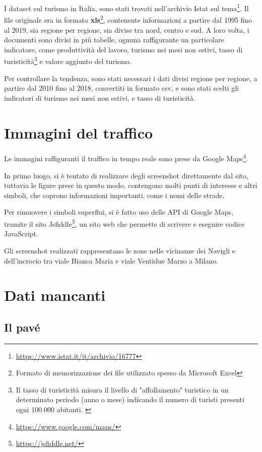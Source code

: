 \documentclass[a4paper,12pt]{report}
\newcommand{\engstyle}[1]{\textbf{#1}}
\begin{document}
I dataset sul turismo in Italia, sono stati trovati nell'archivio Istat sul 
tema\footnote{\url{https://www.istat.it/it/archivio/16777}}. 
Il file originale era in formato \engstyle{xls}\footnote{Formato di memorizzazione dei file 
utilizzato spesso da Microsoft Excel}, 
contenente informazioni a partire dal 1995 
fino al 2019, sia regione per regione, sia divise tra nord, centro e sud. 
A loro volta, i documenti sono divisi in più tabelle, ognuna raffigurante un particolare 
indicatore, come produttività del lavoro, turismo nei mesi non estivi, 
tasso di turisticità\footnote{Il tasso di turisticità misura il livello di "affollamento" 
turistico in un determinato periodo (anno o mese) indicando il numero di turisti presenti 
ogni 100.000 abitanti. \cite{ONTIT:1}} 
e valore aggiunto del turismo. 

Per controllare la tendenza, sono stati necessari i dati divisi regione per regione, 
a partire dal 2010 fino al 2018, convertiti in formato csv, e sono stati scelti gli 
indicatori di turismo nei mesi non estivi, e tasso di turisticità. 

\section{Immagini del traffico}

Le immagini raffiguranti il traffico in tempo reale sono prese da Google 
Maps\footnote{\url{https://www.google.com/maps/}}. 

In primo luogo, si è tentato di realizzare degli screenshot direttamente dal sito, 
tuttavia le figure prese in questo modo, contengono molti punti di interesse e altri simboli, 
che coprono informazioni importanti, come i nomi delle strade. 

Per rimuovere i simboli superflui, si è fatto uso delle API di Google Maps, 
tramite il sito Jsfiddle\footnote{\url{https://jsfiddle.net/}}, un sito web che permette di 
scrivere e eseguire codice JavaScript. 

Gli screenshot realizzati rappresentano le zone nelle vicinanze dei Navigli 
e dell'incrocio tra viale Bianca Maria e viale Ventidue Marzo a Milano. 

\section{Dati mancanti}

\subsection{Il pavé}
\end{document}
